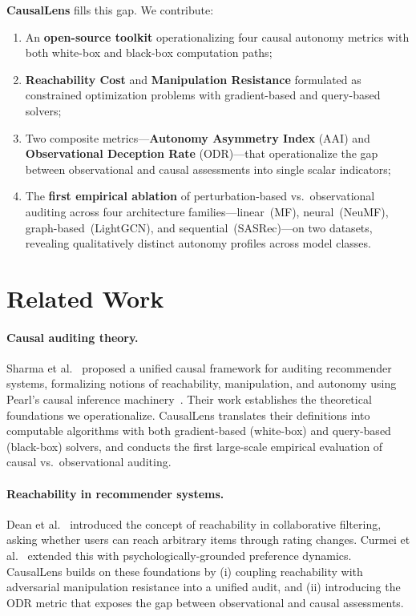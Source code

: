 \documentclass[sigconf,anonymous]{acmart}
\begin{document}
\textbf{CausalLens} fills this gap. We contribute:
\begin{enumerate}
    \item An \textbf{open-source toolkit} operationalizing four causal autonomy metrics with both white-box and black-box computation paths;
    \item \textbf{Reachability Cost} and \textbf{Manipulation Resistance} formulated as constrained optimization problems with gradient-based and query-based solvers;
    \item Two composite metrics---\textbf{Autonomy Asymmetry Index} (AAI) and \textbf{Observational Deception Rate} (ODR)---that operationalize the gap between observational and causal assessments into single scalar indicators;
    \item The \textbf{first empirical ablation} of perturbation-based vs.\ observational auditing across four architecture families---linear~(MF), neural~(NeuMF), graph-based~(LightGCN), and sequential~(SASRec)---on two datasets, revealing qualitatively distinct autonomy profiles across model classes.
\end{enumerate}


\section{Related Work}
\label{sec:related}

\paragraph{Causal auditing theory.}
Sharma et al.~\cite{sharma2024unified} proposed a unified causal framework for auditing recommender systems, formalizing notions of reachability, manipulation, and autonomy using Pearl's causal inference machinery~\cite{pearl2009causality}. Their work establishes the theoretical foundations we operationalize. CausalLens translates their definitions into computable algorithms with both gradient-based (white-box) and query-based (black-box) solvers, and conducts the first large-scale empirical evaluation of causal vs.\ observational auditing.

\paragraph{Reachability in recommender systems.}
Dean et al.~\cite{dean2020recommendations} introduced the concept of reachability in collaborative filtering, asking whether users can reach arbitrary items through rating changes. Curmei et al.~\cite{curmei2021towards} extended this with psychologically-grounded preference dynamics. CausalLens builds on these foundations by (i) coupling reachability with adversarial manipulation resistance into a unified audit, and (ii) introducing the ODR metric that exposes the gap between observational and causal assessments.
\end{document}
